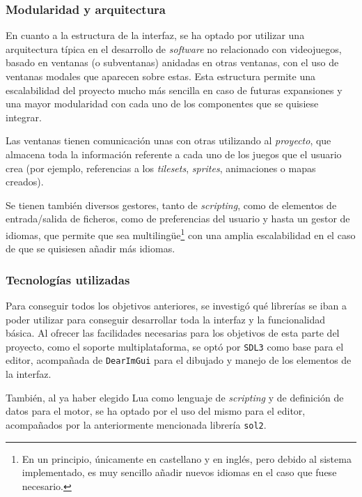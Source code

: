 \subsubsection{Modularidad y arquitectura}
En cuanto a la estructura de la interfaz, se ha optado por utilizar una arquitectura típica en el desarrollo de \textit{software} no relacionado con videojuegos, basado en ventanas (o subventanas) anidadas en otras ventanas, con el uso de ventanas modales que aparecen sobre estas. Esta estructura permite una escalabilidad del proyecto mucho más sencilla en caso de futuras expansiones y una mayor modularidad con cada uno de los componentes que se quisiese integrar.

\medskip

Las ventanas tienen comunicación unas con otras utilizando al \textit{proyecto}, que almacena toda la información referente a cada uno de los juegos que el usuario crea (por ejemplo, referencias a los \textit{tilesets}, \textit{sprites}, animaciones o mapas creados).

\smallskip

Se tienen también diversos gestores, tanto de \textit{scripting}, como de elementos de entrada/salida de ficheros, como de preferencias del usuario y hasta un gestor de idiomas, que permite que \baker{} sea multilingüe\footnote{En un principio, únicamente en castellano y en inglés, pero debido al sistema implementado, es muy sencillo añadir nuevos idiomas en el caso que fuese necesario.} con una amplia escalabilidad en el caso de que se quisiesen añadir más idiomas.

\subsubsection{Tecnologías utilizadas}

Para conseguir todos los objetivos anteriores, se investigó qué librerías se iban a poder utilizar para conseguir desarrollar toda la interfaz y la funcionalidad básica. Al ofrecer las facilidades necesarias para los objetivos de esta parte del proyecto, como el soporte multiplataforma, se optó por \texttt{SDL3} como base para el editor, acompañada de \texttt{DearImGui} para el dibujado y manejo de los elementos de la interfaz.

\medskip

También, al ya haber elegido Lua como lenguaje de \textit{scripting} y de definición de datos para el motor, se ha optado por el uso del mismo para el editor, acompañados por la anteriormente mencionada librería \texttt{sol2}.

